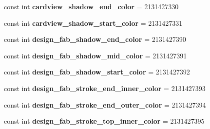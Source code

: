 \begin{DoxyCompactItemize}
\mbox{\label{class_pinned_app_1_1_droid_1_1_resource_1_1_color_a1c13b9b972539448b29c7d6f52f4fda1}} 
const int {\bfseries cardview\+\_\+shadow\+\_\+end\+\_\+color} = 2131427330
\item 
\mbox{\label{class_pinned_app_1_1_droid_1_1_resource_1_1_color_acf849830318fd70a5ca4652bfe2ee002}} 
const int {\bfseries cardview\+\_\+shadow\+\_\+start\+\_\+color} = 2131427331
\item 
\mbox{\label{class_pinned_app_1_1_droid_1_1_resource_1_1_color_a8e8a0fe890d55e23cb124a1185b9533f}} 
const int {\bfseries design\+\_\+fab\+\_\+shadow\+\_\+end\+\_\+color} = 2131427390
\item 
\mbox{\label{class_pinned_app_1_1_droid_1_1_resource_1_1_color_a0715f4a2dd08438a1d90d1f3a80be56f}} 
const int {\bfseries design\+\_\+fab\+\_\+shadow\+\_\+mid\+\_\+color} = 2131427391
\item 
\mbox{\label{class_pinned_app_1_1_droid_1_1_resource_1_1_color_acf3561abf39bc61ff22af09e950de229}} 
const int {\bfseries design\+\_\+fab\+\_\+shadow\+\_\+start\+\_\+color} = 2131427392
\item 
\mbox{\label{class_pinned_app_1_1_droid_1_1_resource_1_1_color_ac347a06bd32fdbea6292cee841f79088}} 
const int {\bfseries design\+\_\+fab\+\_\+stroke\+\_\+end\+\_\+inner\+\_\+color} = 2131427393
\item 
\mbox{\label{class_pinned_app_1_1_droid_1_1_resource_1_1_color_af8c49f97b69a79c4abd1ff5b3360a083}} 
const int {\bfseries design\+\_\+fab\+\_\+stroke\+\_\+end\+\_\+outer\+\_\+color} = 2131427394
\item 
\mbox{\label{class_pinned_app_1_1_droid_1_1_resource_1_1_color_a47c3dd19b7dc65cf021c9d856acd35aa}} 
const int {\bfseries design\+\_\+fab\+\_\+stroke\+\_\+top\+\_\+inner\+\_\+color} = 2131427395
\item 

\end{DoxyCompactItemize}

